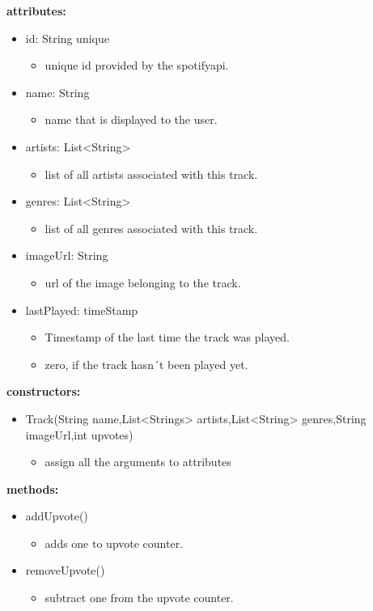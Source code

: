 \documentclass[oneside, nenglish]{sdqtechreport}
\begin{document}
\textbf{attributes:}
\begin{itemize}
    \item id: String {unique}
    \begin{itemize}
        \item unique id provided by the spotifyapi.
    \end{itemize}
    \item name: String
    \begin{itemize}
        \item name that is displayed to the user.
    \end{itemize}
    \item artists: List<String>
    \begin{itemize}
        \item list of all artists associated with this track.
    \end{itemize}
    \item genres: List<String>
    \begin{itemize}
         \item list of all genres associated with this track.
    \end{itemize}
    \item imageUrl: String
    \begin{itemize}
        \item url of the image belonging to the track.
    \end{itemize}
    \item lastPlayed: timeStamp
    \begin{itemize}
        \item Timestamp of the last time the track was played.
        \item zero, if the track hasn´t been played yet.
    \end{itemize}
\end{itemize}
\textbf{constructors:}
\begin{itemize}
    \item Track(String name,List<Strings> artists,List<String> genres,String imageUrl,int upvotes)
    \begin{itemize}
        \item assign all the arguments to attributes
    \end{itemize}
\end{itemize}
\textbf{methods:}
\begin{itemize}
    \item addUpvote()
    \begin{itemize}
        \item adds one to upvote counter.
    \end{itemize}
    \item removeUpvote()
    \begin{itemize}
        \item subtract one from the upvote counter.
    \end{itemize}
    
\end{itemize}
\end{document}
